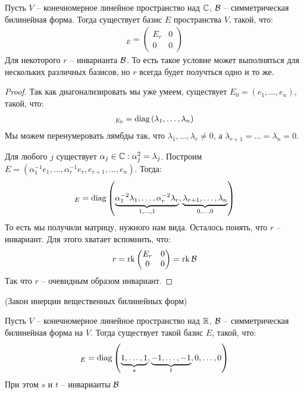 \begin{theorem-non}
    Пусть $V$ -- конечномерное линейное пространство над $\mathbb{C}$, $\mathcal{B}$ -- симметрическая билинейная форма. Тогда существует 
    базис $E$ пространства $V$, такой, что: 
    \begin{gather*}
        [\B]_E = \begin{pmatrix*}
            E_r & 0 \\
            0 & 0
        \end{pmatrix*} 
    \end{gather*} 
    Для некоторого $r$ -- инварианта $\mathcal{B}$. То есть такое условие может выполняться для нескольких различных базисов, но $r$ всегда будет получться одно и то же. 
\end{theorem-non}
\begin{proof}
    Так как диагонализировать мы уже умеем, существует $E_0 = (e_1, \dots, e_n)$, такой, что: 
    \begin{gather*}
        [\B]_{E_0} = \diag{\lambda_1, \dots, \lambda_n}
    \end{gather*}
    Мы можем перенумеровать лямбды так, что $\lambda_1, \dots, \lambda_r \neq 0$, а $\lambda_{r+1} = \dots = \lambda_n = 0$. 

    Для любого $j$ существует $\alpha_j \in \mathbb{C} : \alpha_j^2 = \lambda_j$. 
    Построим $E = (\alpha^{-1}_1 e_1, \dots, \alpha^{-1}_r e_r, e_{r+1}, \dots, e_n)$. 
    Тогда: 
    \begin{gather*}
        [\B]_E = \diag{\underbrace{\alpha_1^{-2} \lambda_1, \dots, \alpha_r^{-2} \lambda_r}_{1, \dots, 1}, \underbrace{\lambda_{r+1}, \dots, \lambda_n}_{0, \dots, 0}}
    \end{gather*}
    То есть мы получили матрицу, нужного нам вида. Осталось понять, что $r$ -- инвариант. Для этого хватает вспомнить, что: 
    \begin{gather*}
        r = \rk{\begin{pmatrix*}
            E_r & 0 \\
            0 & 0
        \end{pmatrix*}} = \rk{\B}
    \end{gather*}
    Так что $r$ -- очевидным образом инвариант. 
\end{proof}
\begin{theorem} (Закон инерции вещественных билинейных форм)

    Пусть $V$ -- конечномерное линейное пространство над $\mathbb{R}$, $\mathcal{B}$ -- симметрическая билинейная форма на $V$. Тогда 
    существует такой базис $E$, такой, что: 
    \begin{gather*}
        [\B]_E = \diag{\underbrace{1, \dots, 1}_s, \underbrace{-1, \dots, -1}_t, 0, \dots, 0}
    \end{gather*}
    При этом $s$ и $t$ -- инварианты $\mathcal{B}$ 
\end{theorem}
